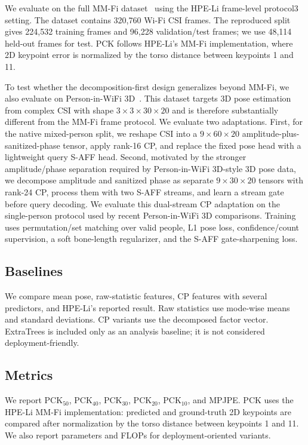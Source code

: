 \documentclass[10pt,conference]{IEEEtran}
\begin{document}
We evaluate on the full MM-Fi dataset~\cite{mmfi2023} using the HPE-Li frame-level protocol3 setting. The dataset contains 320,760 Wi-Fi CSI frames. The reproduced split gives 224,532 training frames and 96,228 validation/test frames; we use 48,114 held-out frames for test. PCK follows HPE-Li's MM-Fi implementation, where 2D keypoint error is normalized by the torso distance between keypoints 1 and 11.

To test whether the decomposition-first design generalizes beyond MM-Fi, we also evaluate on Person-in-WiFi 3D~\cite{personwifi3d2024}. This dataset targets 3D pose estimation from complex CSI with shape $3\times3\times30\times20$ and is therefore substantially different from the MM-Fi frame protocol. We evaluate two adaptations. First, for the native mixed-person split, we reshape CSI into a $9\times60\times20$ amplitude-plus-sanitized-phase tensor, apply rank-16 CP, and replace the fixed pose head with a lightweight query S-AFF head. Second, motivated by the stronger amplitude/phase separation required by Person-in-WiFi 3D-style 3D pose data, we decompose amplitude and sanitized phase as separate $9\times30\times20$ tensors with rank-24 CP, process them with two S-AFF streams, and learn a stream gate before query decoding. We evaluate this dual-stream CP adaptation on the single-person protocol used by recent Person-in-WiFi 3D comparisons. Training uses permutation/set matching over valid people, L1 pose loss, confidence/count supervision, a soft bone-length regularizer, and the S-AFF gate-sharpening loss.

\subsection{Baselines}

We compare mean pose, raw-statistic features, CP features with several predictors, and HPE-Li's reported result. Raw statistics use mode-wise means and standard deviations. CP variants use the decomposed factor vector. ExtraTrees is included only as an analysis baseline; it is not considered deployment-friendly.

\subsection{Metrics}

We report PCK$_{50}$, PCK$_{40}$, PCK$_{30}$, PCK$_{20}$, PCK$_{10}$, and MPJPE. PCK uses the HPE-Li MM-Fi implementation: predicted and ground-truth 2D keypoints are compared after normalization by the torso distance between keypoints 1 and 11. We also report parameters and FLOPs for deployment-oriented variants.
\end{document}
